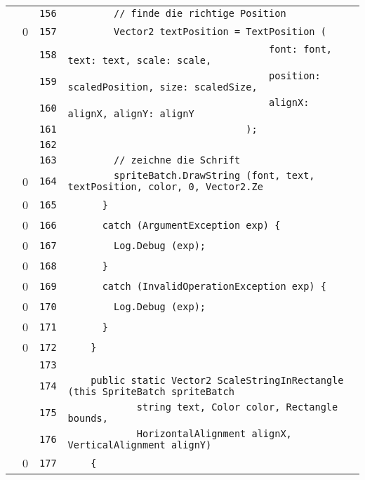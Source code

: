 \documentclass[a4paper,10pt]{article}
\begin{document}
\begin{longtable}[l]{lrrl}
\cellcolor{gray} &  & \verb~156~ & \verb~        // finde die richtige Position~\\
\cellcolor{red} & 0 & \verb~157~ & \verb~        Vector2 textPosition = TextPosition (~\\
\cellcolor{gray} &  & \verb~158~ & \verb~                                   font: font, text: text, scale: scale,~\\
\cellcolor{gray} &  & \verb~159~ & \verb~                                   position: scaledPosition, size: scaledSize,~\\
\cellcolor{gray} &  & \verb~160~ & \verb~                                   alignX: alignX, alignY: alignY~\\
\cellcolor{gray} &  & \verb~161~ & \verb~                               );~\\
\cellcolor{gray} &  & \verb~162~ & \verb~~\\
\cellcolor{gray} &  & \verb~163~ & \verb~        // zeichne die Schrift~\\
\cellcolor{red} & 0 & \verb~164~ & \verb~        spriteBatch.DrawString (font, text, textPosition, color, 0, Vector2.Ze~\\
\cellcolor{red} & 0 & \verb~165~ & \verb~      }~\\
\cellcolor{red} & 0 & \verb~166~ & \verb~      catch (ArgumentException exp) {~\\
\cellcolor{red} & 0 & \verb~167~ & \verb~        Log.Debug (exp);~\\
\cellcolor{red} & 0 & \verb~168~ & \verb~      }~\\
\cellcolor{red} & 0 & \verb~169~ & \verb~      catch (InvalidOperationException exp) {~\\
\cellcolor{red} & 0 & \verb~170~ & \verb~        Log.Debug (exp);~\\
\cellcolor{red} & 0 & \verb~171~ & \verb~      }~\\
\cellcolor{red} & 0 & \verb~172~ & \verb~    }~\\
\cellcolor{gray} &  & \verb~173~ & \verb~~\\
\cellcolor{gray} &  & \verb~174~ & \verb~    public static Vector2 ScaleStringInRectangle (this SpriteBatch spriteBatch~\\
\cellcolor{gray} &  & \verb~175~ & \verb~            string text, Color color, Rectangle bounds,~\\
\cellcolor{gray} &  & \verb~176~ & \verb~            HorizontalAlignment alignX, VerticalAlignment alignY)~\\
\cellcolor{red} & 0 & \verb~177~ & \verb~    {~\\

\end{longtable}
\end{document}
